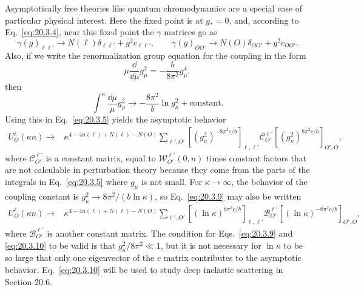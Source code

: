 Asymptotically free theories like quantum chromodynamics are a special case of particular physical interest. Here the fixed point is at $g_*=0$, and, according to Eq.~\eqref{eq:20.3.4}, near this fixed point the $\gamma$ matrices go as
\begin{equation}
\gamma(g)_{\ell\ell'}\longrightarrow
N(\ell)\delta_{\ell\ell'}+g^2c_{\ell\ell'},
\qquad
\gamma(g)_{OO'}\longrightarrow
N(O)\delta_{OO'}+g^2c_{OO'}.
\tag{20.3.7}\label{eq:20.3.7}
\end{equation}
Also, if we write the renormalization group equation for the coupling in the form
\begin{equation}
\mu\frac{\dd}{\dd\mu}g_\mu^2=-\frac{b}{8\pi^2}g_\mu^4,
\tag{20.3.8}\label{eq:20.3.8}
\end{equation}
then
\[
\int^\kappa\frac{\dd\mu}{\mu}g_\mu^2
\longrightarrow-\frac{8\pi^2}{b}\ln g_\kappa^2+\text{constant}.
\]
Using this in Eq.~\eqref{eq:20.3.5} yields the asymptotic behavior
\begin{align}
U_O^\ell(\kappa n)\longrightarrow{}&
\kappa^{4-4n(\ell)+N(\ell)-N(O)}
\sum_{\ell',O'}
\left[
\left(g_\kappa^2\right)^{-8\pi^2c/b}
\right]_{\ell,\ell'}
\mathcal C_{O'}^{\ell'}
\left[
\left(g_\kappa^2\right)^{8\pi^2c/b}
\right]_{O',O},
\tag{20.3.9}\label{eq:20.3.9}
\end{align}
where $\mathcal C_{O'}^{\ell'}$ is a constant matrix, equal to $\mathcal W_{O'}^{\ell'}(0,n)$ times constant factors that are not calculable in perturbation theory because they come from the parts of the integrals in Eq.~\eqref{eq:20.3.5} where $g_\mu$ is not small. For $\kappa\to\infty$, the behavior of the coupling constant is $g_\kappa^2\to8\pi^2/(b\ln\kappa)$, so Eq.~\eqref{eq:20.3.9} may also be written
\begin{align}
U_O^\ell(\kappa n)\longrightarrow{}&
\kappa^{4-4n(\ell)+N(\ell)-N(O)}
\sum_{\ell',O'}
\left[
\left(\ln\kappa\right)^{8\pi^2c/b}
\right]_{\ell,\ell'}
\mathcal B_{O'}^{\ell'}
\left[
\left(\ln\kappa\right)^{-8\pi^2c/b}
\right]_{O',O},
\tag{20.3.10}\label{eq:20.3.10}
\end{align}
where $\mathcal B_{O'}^{\ell'}$ is another constant matrix. The condition for Eqs.~\eqref{eq:20.3.9} and \eqref{eq:20.3.10} to be valid is that $g_\kappa^2/8\pi^2\ll1$, but it is not necessary for $\ln\kappa$ to be so large that only one eigenvector of the $c$ matrix contributes to the asymptotic behavior. Eq.~\eqref{eq:20.3.10} will be used to study deep inelastic scattering in Section 20.6.
